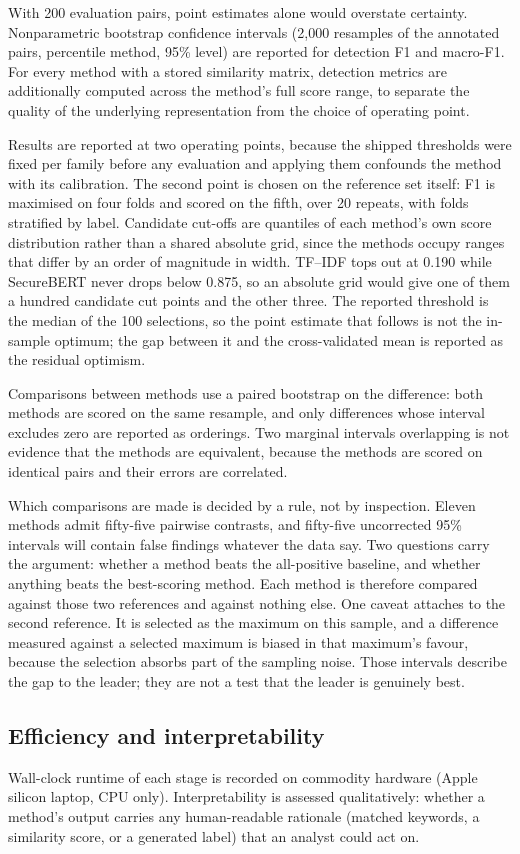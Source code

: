 With 200 evaluation pairs, point estimates alone would overstate certainty.
Nonparametric bootstrap confidence intervals (2{,}000 resamples of the
annotated pairs, percentile method, 95\% level) are reported for detection F1
and macro-F1. For every method with a stored similarity matrix, detection
metrics are additionally computed across the method's full score range, to
separate the quality of the underlying representation from the choice of
operating point.

Results are reported at two operating points, because the shipped thresholds
were fixed per family before any evaluation and applying them confounds the
method with its calibration. The second point is chosen on the reference set
itself: F1 is maximised on four folds and scored on the fifth, over 20 repeats,
with folds stratified by label. Candidate cut-offs are quantiles of each
method's own score distribution rather than a shared absolute grid, since the
methods occupy ranges that differ by an order of magnitude in width. TF--IDF
tops out at 0.190 while SecureBERT never drops below 0.875, so an absolute grid
would give one of them a hundred candidate cut points and the other three. The
reported threshold is the median of the 100 selections, so the point estimate
that follows is not the in-sample optimum; the gap between it and the
cross-validated mean is reported as the residual optimism.

Comparisons between methods use a paired bootstrap on the difference: both
methods are scored on the same resample, and only differences whose interval
excludes zero are reported as orderings. Two marginal intervals overlapping is
not evidence that the methods are equivalent, because the methods are scored on
identical pairs and their errors are correlated.

Which comparisons are made is decided by a rule, not by inspection. Eleven
methods admit fifty-five pairwise contrasts, and fifty-five uncorrected 95\%
intervals will contain false findings whatever the data say. Two questions carry
the argument: whether a method beats the all-positive baseline, and whether
anything beats the best-scoring method. Each method is therefore compared against
those two references and against nothing else. One caveat attaches to the second
reference. It is selected as the maximum on this sample, and a difference
measured against a selected maximum is biased in that maximum's favour, because
the selection absorbs part of the sampling noise. Those intervals describe the
gap to the leader; they are not a test that the leader is genuinely best.

\subsection{Efficiency and interpretability}

Wall-clock runtime of each stage is recorded on commodity hardware (Apple
silicon laptop, CPU only). Interpretability is assessed qualitatively: whether
a method's output carries any human-readable rationale (matched keywords, a
similarity score, or a generated label) that an analyst could act on.

